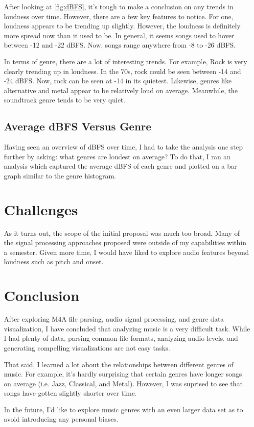 \documentclass[journal]{vgtc}                %
\begin{document}
After looking at \autoref{fig:dBFS}, it's tough to make a conclusion on any
trends in loudness over time. However, there are a few key features to notice.
For one, loudness appears to be trending up slightly. However, the loudness
is definitely more spread now than it used to be. In general, it seems songs
used to hover between -12 and -22 dBFS. Now, songs range anywhere from -8 to -26
dBFS.

In terms of genre, there are a lot of interesting trends. For example, Rock
is very clearly trending up in loudness. In the 70s, rock could be seen between
-14 and -24 dBFS. Now, rock can be seen at -14 in its quietest. Likewise,
genres like alternative and metal appear to be relatively loud on average.
Meanwhile, the soundtrack genre tends to be very quiet.

\subsection{Average dBFS Versus Genre}

Having seen an overview of dBFS over time, I had to take the analysis one step
further by asking: what genres are loudest on average? To do that, I ran an
analysis which captured the average dBFS of each genre and plotted on a bar
graph similar to the genre histogram.

\section{Challenges}

As it turns out, the scope of the initial proposal was much too broad. Many of
the signal processing approaches proposed were outside of my capabilities within
a semester. Given more time, I would have liked to explore audio features beyond
loudness such as pitch and onset.

\section{Conclusion}

After exploring M4A file parsing, audio signal processing, and genre data
visualization, I have concluded that analyzing music is a very difficult task.
While I had plenty of data, parsing common file formats, analyzing audio levels,
and generating compelling visualizations are not easy tasks.

That said, I learned a lot about the relationships between different genres
of music. For example, it's hardly surprising that certain genres have
longer songs on average (i.e. Jazz, Classical, and Metal). However, I was
suprised to see that songs have gotten slightly shorter over time.

In the future, I'd like to explore music genres with an even larger data set as
to avoid introducing any personal biases.

%

%
%
%


\end{document}
